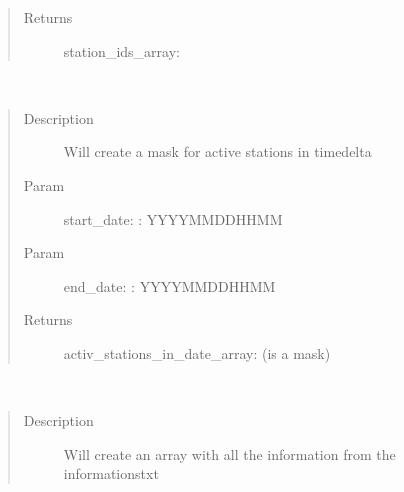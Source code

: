 \documentclass[letterpaper,10pt,english]{sphinxmanual}
\begin{document}
\begin{fulllineitems}
\begin{fulllineitems}
\begin{quote}
\begin{description}
\item[{Returns}] \leavevmode
\sphinxAtStartPar
station\_ids\_array: 

\end{description}\end{quote}

\end{fulllineitems}


\begin{fulllineitems}
\label{\detokenize{DwdDataPrep:DwdDataPrep.Reader.get_station_ids_in_date}}~\begin{quote}\begin{description}
\item[{Description}] \leavevmode
\sphinxAtStartPar
Will create a mask for active stations in timedelta

\item[{Param}] \leavevmode
\sphinxAtStartPar
start\_date: : YYYYMMDDHHMM

\item[{Param}] \leavevmode
\sphinxAtStartPar
end\_date: : YYYYMMDDHHMM

\item[{Returns}] \leavevmode
\sphinxAtStartPar
activ\_stations\_in\_date\_array:  (is a mask)

\end{description}\end{quote}

\end{fulllineitems}


\begin{fulllineitems}
\label{\detokenize{DwdDataPrep:DwdDataPrep.Reader.get_station_information}}~\begin{quote}\begin{description}
\item[{Description}] \leavevmode
\sphinxAtStartPar
Will create an array with all the information from the informations\sphinxhyphen{}txt


\end{description}
\end{quote}
\end{fulllineitems}
\end{fulllineitems}
\end{document}
